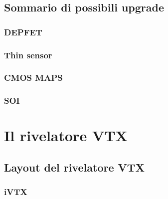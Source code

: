 \documentclass[10pt,a4paper,twoside]{report}
\begin{document}



\section{Sommario di possibili upgrade}

\subsection{DEPFET}

\subsection{Thin sensor}

\subsection{CMOS MAPS}

\subsection{SOI}


\chapter{Il rivelatore VTX}


\section{Layout del rivelatore VTX}

\subsection{iVTX}
\end{document}
